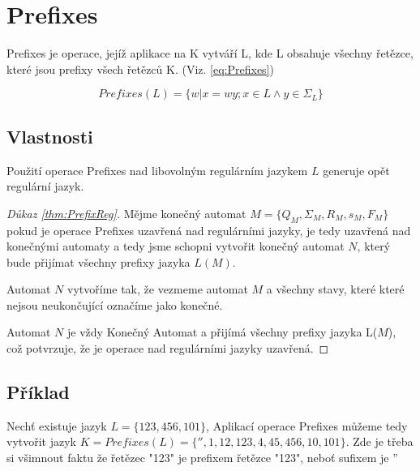 \section{Prefixes}
Prefixes je operace, jejíž aplikace na K vytváří L, kde L obsahuje všechny řetězce, které jsou prefixy všech řetězců K. (Viz. \ref{eq:Prefixes})

\begin{equation}\label{eq:Prefixes}
Prefixes(L) = \{w|x=wy; x \in L \land y \in \Sigma_{L}\}
\end{equation}

\subsection{Vlastnosti}
\begin{theorem} \label{thm:PrefixReg}
	Použití operace Prefixes nad libovolným regulárním jazykem $L$ generuje opět regulární jazyk.
\end{theorem}

\begin{proof}[Důkaz \ref{thm:PrefixReg}]
	Mějme konečný automat $M=\{Q_{M}, \Sigma_{M}, R_{M}, s_{M}, F_{M}\}$ pokud je operace Prefixes uzavřená nad regulárními jazyky, je tedy uzavřená nad konečnými automaty a tedy jsme schopni vytvořit konečný automat $N$, který bude přijímat všechny prefixy jazyka $L(M)$.
	
	Automat $N$ vytvoříme tak, že vezmeme automat $M$ a všechny stavy, které které nejsou neukončující označíme jako konečné.
	
	Automat $N$ je vždy Konečný Automat a přijímá všechny prefixy jazyka L($M$), což potvrzuje, že je operace nad regulárními jazyky uzavřená.
\end{proof}

\subsection{Příklad}
Nechť existuje jazyk $L=\{123, 456, 101\}$, Aplikací operace Prefixes můžeme tedy vytvořit jazyk $K=Prefixes(L) = \{'', 1, 12, 123, 4, 45, 456, 10, 101\}$. Zde je třeba si všimnout faktu že řetězec "123" je prefixem řetězce "123", neboť sufixem je ''
